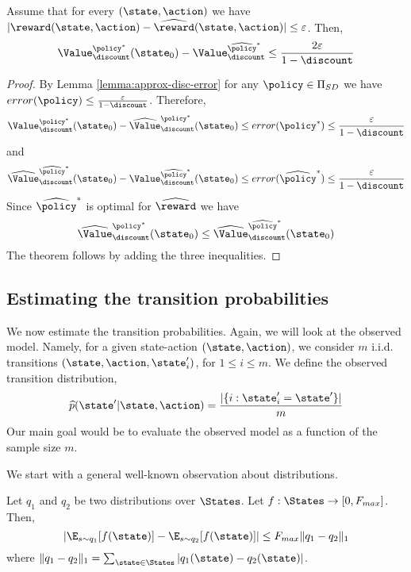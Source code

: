 \begin{theorem}
\label{thm:approx-model-disc}
%
Assume that for every $(\state,\action)$ we have
$|\reward(\state,\action)-\widehat{\reward}(\state,\action)|\leq
\varepsilon$. Then,
\[
\Value^{\policy^*}_\discount(\state_0) -
\Value^{\widehat{\policy}^*}_\discount \leq
\frac{2\varepsilon}{1-\discount}
\]
\end{theorem}

\begin{proof}
By Lemma \ref{lemma:approx-disc-error} for any $\policy\in {\Pi
_{SD}}$ we have $error(\policy)\leq
\frac{\varepsilon}{1-\discount}$. Therefore,
\[
\Value^{\policy^*}_\discount(\state_0)-
\widehat{\Value}^{\policy^*}_\discount(\state_0)\leq
error(\policy^*)\leq \frac{\varepsilon}{1-\discount}
\]
and
\[
\widehat{\Value}^{\widehat{\policy}^*}_\discount(\state_0)-
\Value^{\widehat{\policy}^*}_\discount(\state_0)\leq
error(\widehat{\policy}^*)\leq \frac{\varepsilon}{1-\discount}
\]
Since $\widehat{\policy}^*$ is optimal for $\widehat{\reward}$ we
have
\[
\widehat{\Value}^{\policy^*}_\discount(\state_0)\leq
\widehat{\Value}^{\widehat{\policy}^*}_\discount(\state_0)
\]
The theorem follows by adding the three inequalities.
\end{proof}

\subsection{Estimating the transition probabilities}

We now estimate the transition probabilities. Again, we will look at
the observed model. Namely, for a given state-action
$(\state,\action)$, we consider $m$ i.i.d.
 transitions
$(\state,\action,\state'_i)$, for $1\leq i\leq m$. We define the
observed transition distribution,
\[
\widehat{p}(\state'|\state,\action)=\frac{|\{i:\state'_i=\state'\}|}{m}
\]
Our main goal would be to evaluate the observed model as a function
of the sample size $m$.


We start with a general well-known observation about distributions.

\begin{theorem}
\label{thm:dist-l1} Let $q_1$ and $q_2$ be two distributions over
$\States$. Let $f:\States \rightarrow [0,F_{max}]$. Then,
\[
|\E_{s\sim q_1}[f(\state)]- \E_{s\sim q_2}[f(\state)]|\leq F_{max}
\|q_1-q_2\|_1
\]
where $\|q_1-q_2\|_1=\sum_{\state \in \States}
|q_1(\state)-q_2(\state)|$.
\end{theorem}

